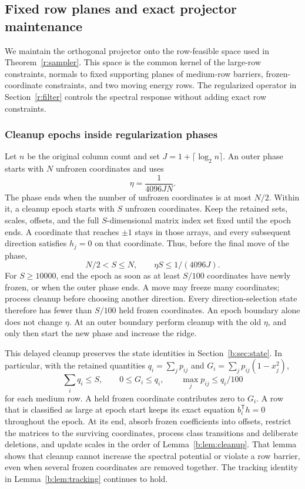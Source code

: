 \documentclass[11pt]{amsart}
\theoremstyle{definition}\newtheorem{definition}[theorem]{Definition}
\theoremstyle{remark}\newtheorem{remark}[theorem]{Remark}
\numberwithin{equation}{section}
\begin{document}
\subsection{Fixed row planes and exact projector maintenance}\label{m:sec:rows}\label{m:maintenance}
We maintain the orthogonal projector onto the row-feasible space used in
Theorem~\ref{r:sampler}. This space is the common kernel of the large-row
constraints, normals to fixed supporting planes of medium-row barriers,
frozen-coordinate constraints, and two moving energy rows.
The regularized operator in Section~\ref{r:filter} controls the spectral
response without adding exact row constraints.

\subsubsection{Cleanup epochs inside regularization phases}\label{m:subsec:epochs}
Let $n$ be the original column count and set
$J=1+\lceil\log_2 n\rceil$. An outer phase starts with $N$ unfrozen
coordinates and uses
\[
                         \eta=\frac{1}{4096JN}.
\]
The phase ends when the number of unfrozen coordinates is at most $N/2$.
Within it, a cleanup epoch starts with $S$ unfrozen coordinates.
Keep the retained sets, scales, offsets, and the full $S$-dimensional
matrix index set fixed until the epoch ends. A coordinate that reaches
$\pm1$ stays in those arrays, and every subsequent direction satisfies
$h_j=0$ on that coordinate. Thus, before the final move of the phase,
\begin{equation}
 N/2<S\le N,\qquad \eta S\le1/(4096J).
                                                               \label{m:eq:epoch-size}
\end{equation}
For $S\ge10000$, end the epoch as soon as at least $S/100$ coordinates
have newly frozen, or when the outer phase ends. A move may freeze many
coordinates; process cleanup before choosing another direction.
Every direction-selection state therefore has fewer than $S/100$
held frozen coordinates. An epoch boundary alone does not change $\eta$.
At an outer boundary perform cleanup with the old $\eta$, and only then
start the new phase and increase the ridge.

This delayed cleanup preserves the state identities in
Section~\ref{b:sec:state}. In particular, with the retained quantities
$q_i=\sum_jp_{ij}$ and $G_i=\sum_jp_{ij}(1-x_j^2)$,
\[
 \sum_iq_i\le S,\qquad 0\le G_i\le q_i,
 \qquad \max_jp_{ij}\le q_i/100
\]
for each medium row. A held frozen coordinate contributes zero to $G_i$.
A row that is classified as large at epoch start keeps its exact equation
$b_i^{\mathsf T}h=0$ throughout the epoch. At its end, absorb frozen
coefficients into offsets, restrict the matrices to the surviving
coordinates, process class transitions and deliberate deletions, and
update scales in the order of Lemma~\ref{b:lem:cleanup}.
That lemma shows that cleanup cannot increase the spectral potential
or violate a row barrier, even when several frozen coordinates are
removed together. The tracking identity in Lemma~\ref{b:lem:tracking}
continues to hold.
\end{document}

